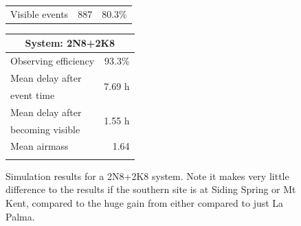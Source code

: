 \begin{colsection}
\begin{colsection}
\begin{figure}[p]
\begin{center}
\begin{minipage}[t]{0.37\textwidth}
\begin{tabular}{lrr}
                \midrule
                Visible events & 887 &  80.3\% \\
            \end{tabular}
        \end{minipage}
        \begin{minipage}[t]{0.35\textwidth}\vspace{0pt}
            \begin{tabular}{lr}
                \multicolumn{2}{c}{\textbf{System: 2N8+2K8}} \\
                \midrule
                Observing efficiency & 93.3\% \\
                \midrule
                Mean delay after     & \multirow{2}{*}{7.69 h} \\
                event time           & \\
                Mean delay after     & \multirow{2}{*}{1.55 h} \\
                becoming visible     & \\
                \midrule
                Mean airmass         & 1.64 \\
                & \\
            \end{tabular}
        \end{minipage}
    \end{center}
    \caption[GW simulation results: 2N8+2K8 system]{
        Simulation results for a 2N8+2K8 system. Note it makes very little difference to the results if the southern site is at Siding Spring or Mt Kent, compared to the huge gain from either compared to just La Palma.
    }\label{fig:gw_sim_2n8+2k8}
\end{figure}

\clearpage


\end{colsection}
\end{colsection}
